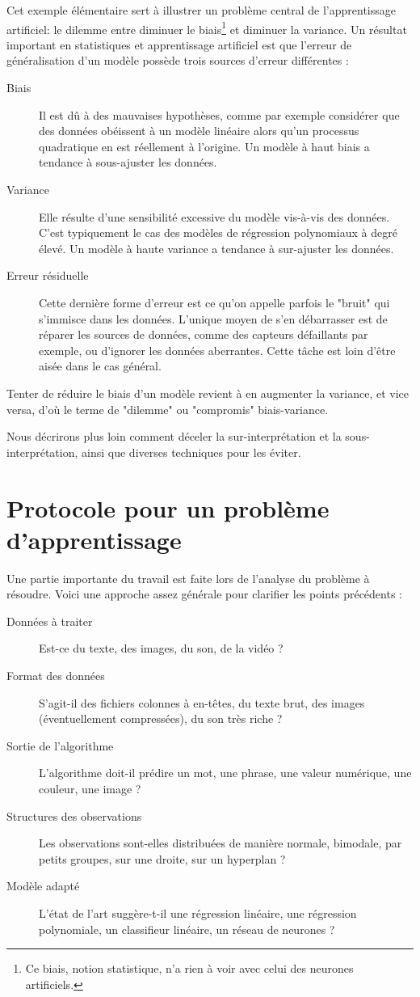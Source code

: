 Cet exemple élémentaire sert à illustrer un problème central de l'apprentissage artificiel: le dilemme entre diminuer le biais\footnote{Ce biais, notion statistique, n'a rien à voir avec celui des neurones artificiels.} et diminuer la variance. Un résultat important en statistiques et apprentissage artificiel est que l'erreur de généralisation d'un modèle  possède trois sources d'erreur différentes : 
\begin{description}
\item [Biais] Il est dû à des mauvaises hypothèses, comme par exemple considérer que des données obéissent à un modèle linéaire alors qu'un processus quadratique en est réellement à l'origine. Un modèle à haut biais a tendance à sous-ajuster les données.
\item [Variance] Elle résulte d'une sensibilité excessive du modèle vis-à-vis des données. C'est typiquement le cas des modèles de régression polynomiaux à degré élevé. Un modèle à haute variance a tendance à sur-ajuster les données.
\item[Erreur résiduelle] Cette dernière forme d'erreur est ce qu'on appelle parfois le "bruit" qui s'immisce dans les données. L'unique moyen de s'en débarrasser est de réparer les sources de données, comme des capteurs défaillants par exemple, ou d'ignorer les données aberrantes. Cette tâche est loin d'être aisée dans le cas général.
\end{description}

Tenter de réduire le biais d'un modèle revient à en augmenter la variance, et vice versa, d'où le terme de "dilemme" ou "compromis" biais-variance.

Nous décrirons plus loin comment déceler la sur-interprétation et la sous-interprétation, ainsi que diverses techniques pour les éviter.

\section{Protocole pour un problème d'apprentissage}
Une partie importante du travail est faite lors de l'analyse du problème à résoudre. Voici une approche assez générale pour clarifier les points précédents :

\begin{description}
\item [Données à traiter] Est-ce du texte, des images, du son, de la vidéo ?
\item [Format des données] S'agit-il des fichiers colonnes à en-têtes, du texte brut, des images (éventuellement compressées), du son très riche ?
\item [Sortie de l'algorithme] L'algorithme doit-il prédire un mot, une phrase, une valeur numérique, une couleur, une image ?
\item [Structures des observations] Les observations sont-elles distribuées de manière normale, bimodale, par petits groupes, sur une droite, sur un hyperplan ? 
\item [Modèle adapté] L'état de l'art suggère-t-il une régression linéaire, une régression polynomiale, un classifieur linéaire, un réseau de neurones ?
\end{description}

